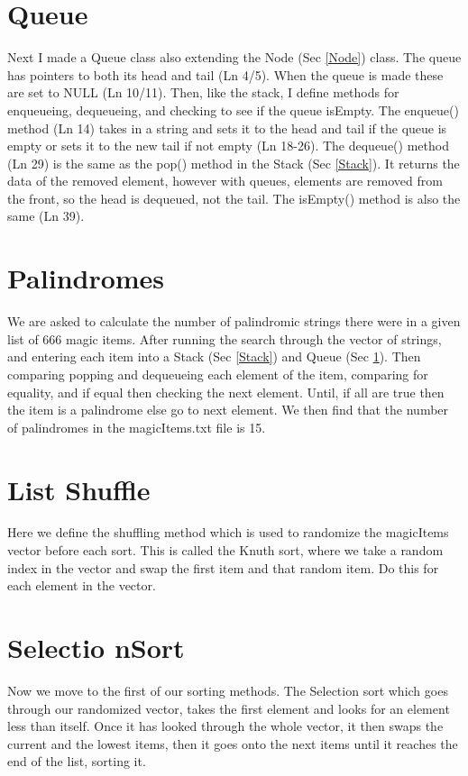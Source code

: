 \documentclass[12pt, letterpaper]{article}
\begin{document}
\section{Queue} \label{Queue}
Next I made a Queue class also extending the Node (Sec \ref{Node}) class. The queue has pointers to both its head and tail (Ln 4/5). When the queue is made these are set to NULL (Ln 10/11). Then, like the stack, I define methods for
enqueueing, dequeueing, and checking to see if the queue isEmpty. The enqueue() method (Ln 14) takes in a string and sets it to the head and tail if the queue is empty or sets it to the new tail if not empty (Ln 18-26). The dequeue() method (Ln 29)
is the same as the pop() method in the Stack (Sec \ref{Stack}). It returns the data of the removed element, however with queues, elements are removed from the front, so the head is dequeued, not the tail. The isEmpty() method is also the same (Ln 39).


\section{Palindromes} \label{Palindromes}
We are asked to calculate the number of palindromic strings there were in a given list of 666 magic items. After running the search through the vector of strings, and entering each item into a Stack (Sec \ref{Stack}) and Queue (Sec \ref{Queue}). 
Then comparing popping and dequeueing each element of the item, comparing for equality, and if equal then checking the next element. Until, if all are true then the item is a palindrome else go to next element.
We then find that the number of palindromes in the magicItems.txt file is 15. 


\section{List Shuffle} \label{Shuffle}
Here we define the shuffling method which is used to randomize the magicItems vector before each sort. 
This is called the Knuth sort, where we take a random index in the vector and swap the first item and that random item. Do this for each element in the vector.


\section{Selectio nSort} \label{Selection}
Now we move to the first of our sorting methods. The Selection sort which goes through our randomized vector, takes the first element and looks for an element less than itself. Once it has looked through the whole vector, it then swaps the
current and the lowest items, then it goes onto the next items until it reaches the end of the list, sorting it.

\end{document}
